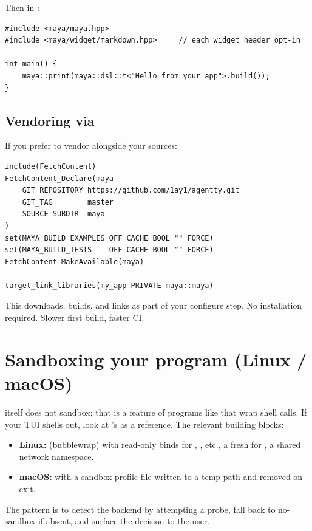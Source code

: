Then in :

\begin{lstlisting}
#include <maya/maya.hpp>
#include <maya/widget/markdown.hpp>     // each widget header opt-in

int main() {
    maya::print(maya::dsl::t<"Hello from your app">.build());
}
\end{lstlisting}

\subsection{Vendoring via }

If you prefer to vendor \maya{} alongside your sources:

\begin{lstlisting}[style=shell]
include(FetchContent)
FetchContent_Declare(maya
    GIT_REPOSITORY https://github.com/1ay1/agentty.git
    GIT_TAG        master
    SOURCE_SUBDIR  maya
)
set(MAYA_BUILD_EXAMPLES OFF CACHE BOOL "" FORCE)
set(MAYA_BUILD_TESTS    OFF CACHE BOOL "" FORCE)
FetchContent_MakeAvailable(maya)

target_link_libraries(my_app PRIVATE maya::maya)
\end{lstlisting}

This downloads, builds, and links \maya{} as part of your
configure step. No installation required. Slower first build,
faster CI.

\section{Sandboxing your program (Linux / macOS)}

\maya{} itself does not sandbox; that is a feature of programs like
\agentty{} that wrap shell calls. If your TUI shells out, look at
\agentty{}'s  as a reference. The
relevant building blocks:

\begin{itemize}[leftmargin=*]
  \item \textbf{Linux:}  (bubblewrap) with read-only
    binds for , , etc., a fresh
     for , a shared network namespace.
  \item \textbf{macOS:}  with a sandbox profile
    file written to a temp path and removed on exit.
\end{itemize}

The pattern is to detect the backend by attempting a
 probe, fall back to no-sandbox if absent,
and surface the decision to the user.

